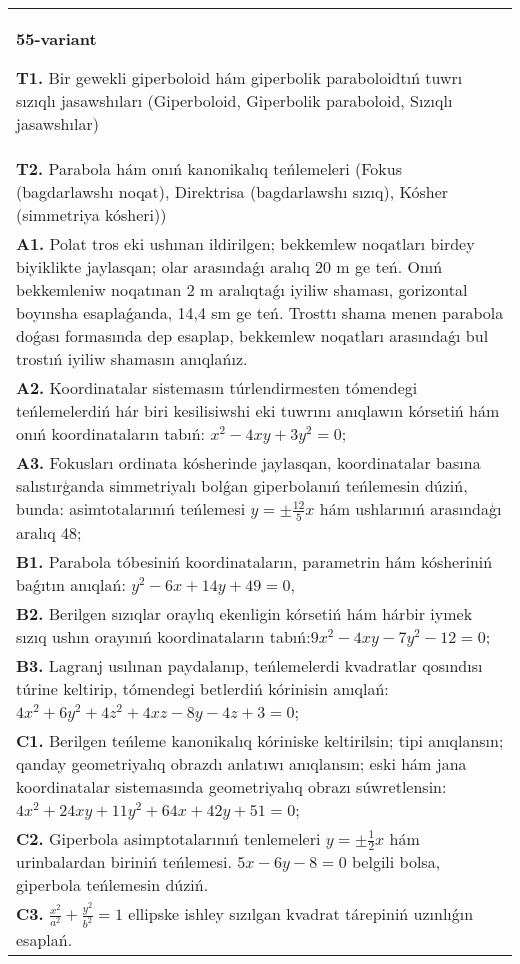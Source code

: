 \documentclass{article}
\begin{document}
\begin{tabular}{m{17cm}}
\textbf{55-variant}
\newline

\textbf{T1.} Bir gewekli giperboloid hám giperbolik paraboloidtıń tuwrı sızıqlı jasawshıları (Giperboloid, Giperbolik paraboloid, Sızıqlı jasawshılar) \\
\textbf{T2.} Parabola hám onıń kanonikalıq teńlemeleri (Fokus (bagdarlawshı noqat), Direktrisa (bagdarlawshı sızıq), Kósher (simmetriya kósheri)) \\
\textbf{A1.} Polat tros eki ushınan ildirilgen; bekkemlew noqatları birdey biyiklikte jaylasqan; olar arasındaǵı aralıq 20 m ge teń. Onıń bekkemleniw noqatınan 2 m aralıqtaǵı iyiliw shaması, gorizontal boyınsha esaplaǵanda, 14,4 sm ge teń. Trosttı shama menen parabola doǵası formasında dep esaplap, bekkemlew noqatları arasındaǵı bul trostıń iyiliw shamasın anıqlańız. \\
\textbf{A2.} Koordinatalar sistemasın túrlendirmesten tómendegi teńlemelerdiń hár biri kesilisiwshi eki tuwrını anıqlawın kórsetiń hám onıń koordinataların tabıń: $x^2-4 x y+3 y^2=0$; \\
\textbf{A3.} Fokusları ordinata kósherinde jaylasqan, koordinatalar basına salıstırģanda simmetriyalı bolǵan giperbolanıń teńlemesin dúziń, bunda: asimtotalarınıń teńlemesi $y= \pm \frac{12}{5} x$ hám ushlarınıń arasındaģı aralıq 48; \\
\textbf{B1.} Parabola tóbesiniń koordinataların, parametrin hám kósheriniń baǵıtın anıqlań: $y^2-6 x+14 y+49=0$, \\
\textbf{B2.} Berilgen sızıqlar oraylıq ekenligin kórsetiń hám hárbir iymek sızıq ushın orayınıń koordinataların tabıń:$9 x^2-4 x y-7 y^2-12=0$; \\
\textbf{B3.} Lagranj usılınan paydalanıp, teńlemelerdi kvadratlar qosındısı túrine keltirip, tómendegi betlerdiń kórinisin anıqlań: $4 x^2+6 y^2+4 z^2+4 x z-8 y-4 z+3=0$; \\
\textbf{C1.} Berilgen teńleme kanonikalıq kóriniske keltirilsin; tipi anıqlansın; qanday geometriyalıq obrazdı anlatıwı anıqlansın; eski hám jana koordinatalar sistemasında geometriyalıq obrazı súwretlensin: $4 x^2+24 x y+11 y^2+64 x+42 y+51=0$; \\
\textbf{C2.} Giperbola asimptotalarınıń tenlemeleri $y= \pm \frac{1}{2} x$ hám urinbalardan biriniń teńlemesi. $5 x-6 y-8=0$ belgili bolsa, giperbola teńlemesin dúziń. \\
\textbf{C3.} $\frac{x^2}{a^2}+\frac{y^2}{b^2}=1$ ellipske ishley sızılgan kvadrat tárepiniń uzınlıǵın esaplań. \\

\end{tabular}
\vspace{1cm}
\end{document}
